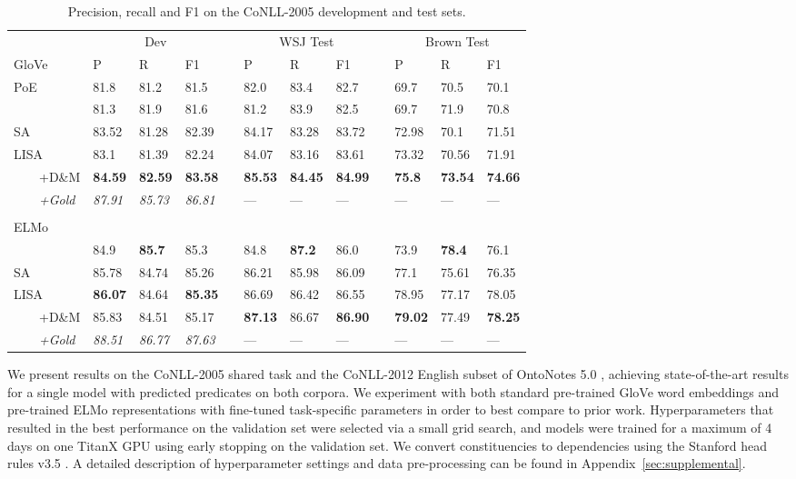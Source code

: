 \documentclass[11pt,a4paper]{article}
\begin{document}
\begin{table*}[t!]
\begin{tabular}{llllllllllll}
& \multicolumn{3}{c}{Dev} && \multicolumn{3}{c}{WSJ Test} && \multicolumn{3}{c}{Brown Test} \\ \cline{2-4} \cline{6-8} \cline{10-12}
GloVe & P & R & F1 && P & R & F1 && P & R & F1\\ \hline \hline
\citet{he2017deep} PoE & 81.8 &  81.2 & 81.5 & & 82.0 & 83.4 & 82.7 && 69.7 &  70.5 & 70.1 \\ 
\citet{he2018jointly} & 81.3 & 81.9 & 81.6 & & 81.2 & 83.9 & 82.5 && 69.7 & 71.9 & 70.8\\ \hline
SA &  83.52 & 81.28 & 82.39 &&  84.17 &	83.28 &	83.72 && 72.98 & 70.1 & 71.51 \\ 
LISA &  83.1 & 81.39 &  82.24 && 84.07 & 83.16 & 83.61 && 73.32 & 70.56 & 71.91\\ 			
\ \ \ \ +D\&M & {\bf 84.59} & {\bf 82.59} &	{\bf 83.58} && {\bf 85.53} & {\bf 84.45} & {\bf 84.99} && {\bf 75.8} & {\bf 73.54} & {\bf 74.66}\\ 	
\ \ \ \ \emph{+Gold} & \emph{87.91} & \emph{85.73} & \emph{86.81} && --- & --- & --- && --- & --- & --- \\
& & & && & & && & & \\
ELMo & & & && & & && & & \\ \hline \hline
\citet{he2018jointly} & 84.9 & {\bf 85.7} & 85.3 & & 84.8 & {\bf 87.2} & 86.0 && 73.9 & {\bf 78.4} & 76.1\\ \hline
SA &  85.78	& 84.74	& 85.26 &&  86.21 &	85.98 &	86.09 && 77.1 &	75.61 &	76.35 \\ 
LISA &  {\bf 86.07} & 84.64 & {\bf 85.35} && 86.69 & 86.42 & 86.55 && 78.95 & 77.17 &	78.05\\ 			
\ \ \ \ +D\&M &85.83 &	84.51 &	85.17 && {\bf 87.13} & 86.67 & {\bf 86.90} && {\bf 79.02} & 77.49 & {\bf 78.25}\\ 	
\ \ \ \ \emph{+Gold} & \emph{88.51} & \emph{86.77} & \emph{87.63} && --- & --- & --- && --- & --- & ---
\end{tabular}
\caption{Precision, recall and F1 on the CoNLL-2005 development and test sets. \label{tab:conll05-results}}
\end{table*}

We present results on the CoNLL-2005 shared task \citep{carreras2005introduction} and the CoNLL-2012 English subset of OntoNotes 5.0 \citep{pradhan2013towards}, achieving state-of-the-art results for a single model with predicted predicates on both corpora. We experiment with both standard pre-trained GloVe word embeddings \citep{pennington2014glove} and pre-trained ELMo representations with fine-tuned task-specific parameters \citep{peters2018deep} in order to best compare to prior work. Hyperparameters that resulted in the best performance on the validation set were selected via a small grid search, and models were trained for a maximum of 4 days on one TitanX GPU using early stopping on the validation set.
We convert constituencies to dependencies using the Stanford head rules v3.5 \citep{deMarneffe2008}. A detailed description of hyperparameter settings and data pre-processing can be found in Appendix~\ref{sec:supplemental}.
\end{document}
